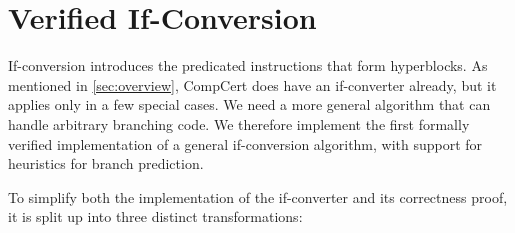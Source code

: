 
\section{Verified If-Conversion}%
\label{sec:hs:if-conversion}

If-conversion introduces the predicated instructions that form hyperblocks.  As
mentioned in \cref{sec:overview}, CompCert does have an if-converter already,
but it applies only in a few special cases. We need a more general algorithm
that can handle arbitrary branching code.
We therefore implement the first formally verified implementation of a general
if-conversion algorithm, with support for heuristics for branch prediction.

To simplify both the implementation of the if-converter and its correctness
proof, it is split up into three distinct
transformations:%

